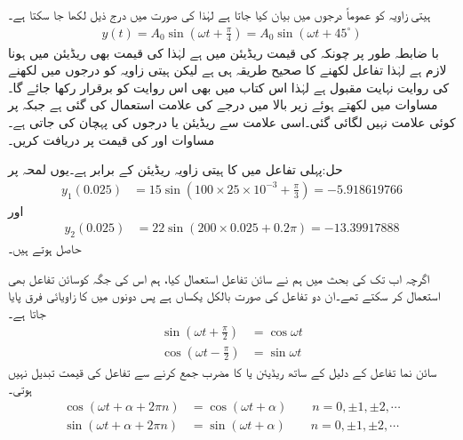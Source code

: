 ہیتی زاویہ کو عموماً درجوں میں بیان کیا جاتا ہے لہٰذا  کی صورت میں درج ذیل لکھا جا سکتا  ہے۔
\begin{align}\label{مساوات_بدلتا_زاویہ_ہٹاو_روایتی_طریقہ}
y(t)=A_0 \sin \left(\omega t +\frac{\pi}{4}\right)=A_0 \sin\left(\omega t+45^{\circ}\right)
\end{align}
با ضابطہ طور پر چونکہ  کی قیمت ریڈیئن میں ہے لہٰذا  کی قیمت بھی ریڈیئن میں ہونا لازم ہے لہٰذا تفاعل لکھنے کا صحیح طریقہ  ہی ہے لیکن ہیتی زاویہ کو درجوں میں لکھنے کی روایت نہایت مقبول ہے لہٰذا اس کتاب میں بھی اس روایت کو برقرار رکھا جائے گا۔مساوات  میں  لکھتے ہوئے زیر بالا میں درجے کی علامت  استعمال کی گئی ہے جبکہ  پر کوئی علامت نہیں لگائی گئی۔اسی علامت سے ریڈیئن یا درجوں کی پہچان کی جاتی ہے۔
مساوات  اور  کی قیمت  پر دریافت کریں۔

حل:پہلی تفاعل میں  کا ہیتی زاویہ  ریڈیئن کے برابر ہے۔یوں
 لمحہ  پر
\begin{align*}
y_1(0.025)&=15\sin\left(100\times 25\times 10^{-3}+\frac{\pi}{3}\right)=-5.918619766
\end{align*}
اور
\begin{align*}
y_2(0.025)&=22\sin(200\times 0.025+0.2\pi)=-13.39917888
\end{align*}
حاصل ہوتے ہیں۔

اگرچہ اب تک کی بحث میں ہم نے سائن تفاعل استعمال کیا، ہم اس کی جگہ کوسائن تفاعل بھی استعمال کر سکتے تھے۔ان دو تفاعل کی صورت بالکل یکساں ہے پس دونوں میں  کا زاویائی فرق پایا جاتا ہے۔
\begin{align}
\sin \left(\omega t+\frac{\pi}{2}\right)&=\cos \omega t\\
\cos \left(\omega t-\frac{\pi}{2}\right)&=\sin \omega t
\end{align}
سائن نما تفاعل کے دلیل  کے ساتھ  ریڈیئن یا  کا مضرب جمع کرنے سے  تفاعل کی قیمت تبدیل نہیں ہوتی۔
\begin{align}
\cos(\omega t +\alpha+2\pi n)&=\cos(\omega t +\alpha) \quad \quad  n=0,\pm 1, \pm 2, \cdots \label{مساوات_بدلتا_طول_بعد_وہی_موج}\\
\sin(\omega t +\alpha+2\pi n)&=\sin(\omega t +\alpha) \quad \quad  n=0,\pm 1, \pm 2, \cdots \label{مساوات_بدلتا_طول_بعد_وہی_موج_ب}
\end{align}

